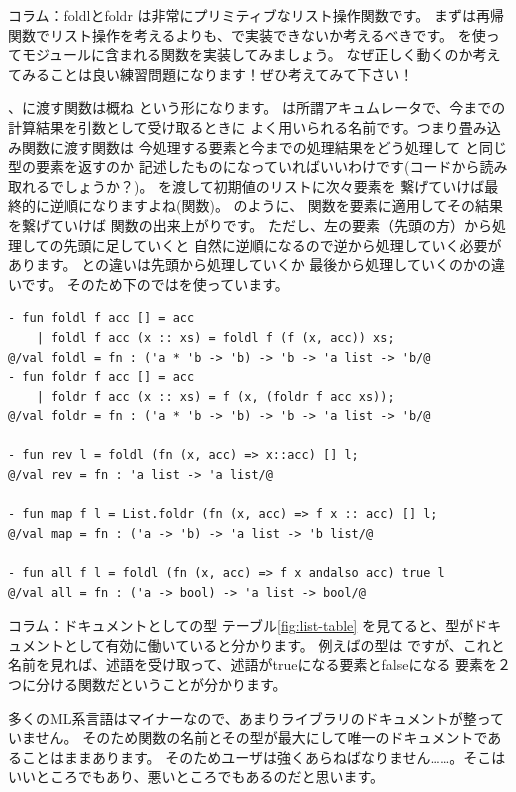 \documentclass[11pt,a4paper]{jarticle}
\begin{document}
\begin{itembox}[l]{コラム：foldlとfoldr}
  は非常にプリミティブなリスト操作関数です。
  まずは再帰関数でリスト操作を考えるよりも、で実装できないか考えるべきです。
  を使ってモジュールに含まれる関数を実装してみましょう。
  なぜ正しく動くのか考えてみることは良い練習問題になります！ぜひ考えてみて下さい！

  、に渡す関数は概ね
  という形になります。
  は所謂アキュムレータで、今までの計算結果を引数として受け取るときに
  よく用いられる名前です。つまり畳み込み関数に渡す関数は
  今処理する要素と今までの処理結果をどう処理して
  と同じ型の要素を返すのか
  記述したものになっていればいいわけです(コードから読み取れるでしょうか？)。
  を渡して初期値のリストに次々要素を
  繋げていけば最終的に逆順になりますよね(関数)。
  のように、
  関数を要素に適用してその結果を繋げていけば
  関数の出来上がりです。
  ただし、左の要素（先頭の方）から処理しての先頭に足していくと
  自然に逆順になるので逆から処理していく必要があります。
  との違いは先頭から処理していくか
  最後から処理していくのかの違いです。
  そのため下のではを使っています。

\begin{lstlisting}
- fun foldl f acc [] = acc
    | foldl f acc (x :: xs) = foldl f (f (x, acc)) xs;
@/val foldl = fn : ('a * 'b -> 'b) -> 'b -> 'a list -> 'b/@
- fun foldr f acc [] = acc
    | foldr f acc (x :: xs) = f (x, (foldr f acc xs));
@/val foldr = fn : ('a * 'b -> 'b) -> 'b -> 'a list -> 'b/@

- fun rev l = foldl (fn (x, acc) => x::acc) [] l;
@/val rev = fn : 'a list -> 'a list/@

- fun map f l = List.foldr (fn (x, acc) => f x :: acc) [] l;
@/val map = fn : ('a -> 'b) -> 'a list -> 'b list/@

- fun all f l = foldl (fn (x, acc) => f x andalso acc) true l
@/val all = fn : ('a -> bool) -> 'a list -> bool/@
\end{lstlisting}
\end{itembox}

\begin{itembox}[l]{コラム：ドキュメントとしての型}
テーブル\ref{fig:list-table} を見てると、型がドキュメントとして有効に働いていると分かります。
例えばの型は
ですが、これと名前を見れば、述語を受け取って、述語がtrueになる要素とfalseになる
要素を２つに分ける関数だということが分かります。

多くのML系言語はマイナーなので、あまりライブラリのドキュメントが整っていません。
そのため関数の名前とその型が最大にして唯一のドキュメントであることはままあります。
そのためユーザは強くあらねばなりません……。そこはいいところでもあり、悪いところでもあるのだと思います。
\end{itembox}
\end{document}
